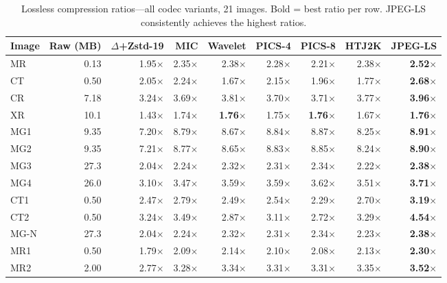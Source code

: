 \documentclass[journal]{IEEEtran}
\begin{document}
\begin{table}[t]
\centering
\caption{Lossless compression ratios---all codec variants, 21 images. Bold =
best ratio per row. JPEG-LS consistently achieves the highest ratios.}
\label{tab:ratios}
\scriptsize
\begin{tabular}{lrrrrrrrr}
\toprule
Image & Raw (MB) & $\Delta$+Zstd-19 & MIC & Wavelet & PICS-4 & PICS-8 & HTJ2K & JPEG-LS \\
\midrule
MR   & 0.13 & 1.95$\times$ & 2.35$\times$ & 2.38$\times$ & 2.28$\times$ & 2.21$\times$ & 2.38$\times$ & \textbf{2.52$\times$} \\
CT   & 0.50 & 2.05$\times$ & 2.24$\times$ & 1.67$\times$ & 2.15$\times$ & 1.96$\times$ & 1.77$\times$ & \textbf{2.68$\times$} \\
CR   & 7.18 & 3.24$\times$ & 3.69$\times$ & 3.81$\times$ & 3.70$\times$ & 3.71$\times$ & 3.77$\times$ & \textbf{3.96$\times$} \\
XR   & 10.1 & 1.43$\times$ & 1.74$\times$ & \textbf{1.76$\times$} & 1.75$\times$ & \textbf{1.76$\times$} & 1.67$\times$ & \textbf{1.76$\times$} \\
MG1  & 9.35 & 7.20$\times$ & 8.79$\times$ & 8.67$\times$ & 8.84$\times$ & 8.87$\times$ & 8.25$\times$ & \textbf{8.91$\times$} \\
MG2  & 9.35 & 7.21$\times$ & 8.77$\times$ & 8.65$\times$ & 8.83$\times$ & 8.85$\times$ & 8.24$\times$ & \textbf{8.90$\times$} \\
MG3  & 27.3 & 2.04$\times$ & 2.24$\times$ & 2.32$\times$ & 2.31$\times$ & 2.34$\times$ & 2.22$\times$ & \textbf{2.38$\times$} \\
MG4  & 26.0 & 3.10$\times$ & 3.47$\times$ & 3.59$\times$ & 3.59$\times$ & 3.62$\times$ & 3.51$\times$ & \textbf{3.71$\times$} \\
CT1  & 0.50 & 2.47$\times$ & 2.79$\times$ & 2.49$\times$ & 2.54$\times$ & 2.29$\times$ & 2.70$\times$ & \textbf{3.19$\times$} \\
CT2  & 0.50 & 3.24$\times$ & 3.49$\times$ & 2.87$\times$ & 3.11$\times$ & 2.72$\times$ & 3.29$\times$ & \textbf{4.54$\times$} \\
MG-N & 27.3 & 2.04$\times$ & 2.24$\times$ & 2.32$\times$ & 2.31$\times$ & 2.34$\times$ & 2.23$\times$ & \textbf{2.38$\times$} \\
MR1  & 0.50 & 1.79$\times$ & 2.09$\times$ & 2.14$\times$ & 2.10$\times$ & 2.08$\times$ & 2.13$\times$ & \textbf{2.30$\times$} \\
MR2  & 2.00 & 2.77$\times$ & 3.28$\times$ & 3.34$\times$ & 3.31$\times$ & 3.31$\times$ & 3.35$\times$ & \textbf{3.52$\times$} \\

\end{tabular}
\end{table}
\end{document}
